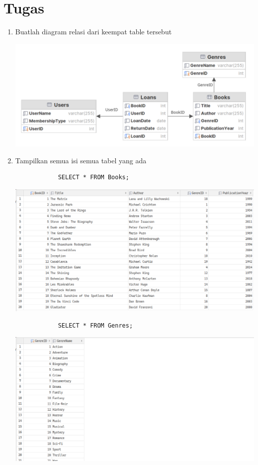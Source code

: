 \documentclass[12pt,titlepage]{article}
\begin{document}
\section{Tugas}
\begin{enumerate}
    \item {
        Buatlah diagram relasi dari keempat table tersebut

        \includegraphics[width=.6\textwidth]{./images/diagram.png}
    }
    \item {
        Tampilkan semua isi semua tabel yang ada

        \begin{verbatim}
            SELECT * FROM Books;
        \end{verbatim}

        \includegraphics[width=.8\textwidth]{./images/books.png}

        \begin{verbatim}
            SELECT * FROM Genres;
        \end{verbatim}

        \includegraphics[width=.8\textwidth]{./images/genres.png}

}
\end{enumerate}
\end{document}
